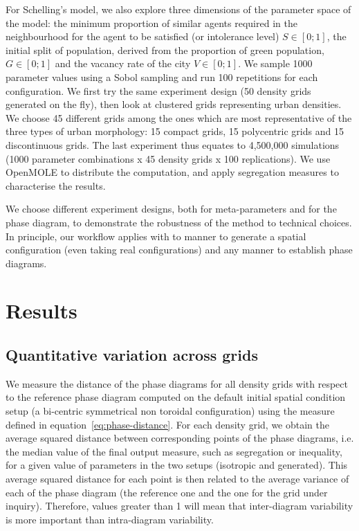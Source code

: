 \documentclass[preprint,5p,times,twocolumn,authoryear]{elsarticle}
\def \draft {1}
\newcommand{\todo}[1]{
\ifthenelse{\draft=1}{\textcolor{red!50!blue}{\textbf{TODO : \textit{#1}}}}{}
}
\begin{document}
For Schelling's model, we also explore three dimensions of the parameter space of the model: the minimum proportion of similar agents required in the neighbourhood for the agent to be satisfied (or intolerance level) $S\in \left[0;1\right]$, the initial split of population, derived from the proportion of green population, $G\in \left[0;1\right]$ and the vacancy rate of the city $V\in \left[0;1\right]$. We sample 1000 parameter values using a Sobol sampling and run 100 repetitions for each configuration. We first try the same experiment design (50 density grids generated on the fly), then look at clustered grids representing urban densities. We choose 45 different grids among the ones which are most representative of the three types of urban morphology: 15 compact grids, 15 polycentric grids and 15 discontinuous grids. The last experiment thus equates to 4,500,000 simulations (1000 parameter combinations x 45 density grids x 100 replications). We use OpenMOLE to distribute the computation, and apply segregation measures to characterise the results.



We choose different experiment designs, both for meta-parameters and for the phase diagram, to demonstrate the robustness of the method to technical choices. In principle, our workflow applies with to manner to generate a spatial configuration (even taking real configurations) and any manner to establish phase diagrams.




\section{Results}

\todo{add code and data availability statement here}

\subsection{Quantitative variation across grids}

We measure the distance of the phase diagrams for all density grids with respect to the reference phase diagram computed on the default initial spatial condition setup (a bi-centric symmetrical non toroidal configuration) using the measure defined in equation~\ref{eq:phase-distance}. For each density grid, we obtain the average squared distance between corresponding points of the phase diagrams, i.e. the median value of the final output measure, such as segregation or inequality, for a given value of parameters in the two setups (isotropic and generated). This average squared distance for each point is then related to the average variance of each of the phase diagram (the reference one and the one for the grid under inquiry). Therefore, values greater than 1 will mean that inter-diagram variability is more important than intra-diagram variability.
\end{document}
